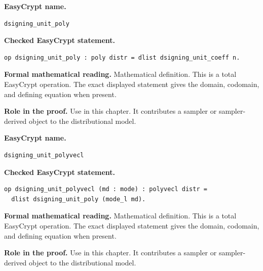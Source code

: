 \begin{formaldefinition}
\noindent\textbf{EasyCrypt name.}
\begin{lstlisting}[language=EasyCrypt,basicstyle=\ttfamily\scriptsize]
dsigning_unit_poly
\end{lstlisting}
\noindent\textbf{Checked EasyCrypt statement.}
\begin{lstlisting}[language=EasyCrypt,basicstyle=\ttfamily\scriptsize]
op dsigning_unit_poly : poly distr = dlist dsigning_unit_coeff n.
\end{lstlisting}
\noindent\textbf{Formal mathematical reading.}
Mathematical definition. This is a total EasyCrypt operation.  The exact displayed statement gives the domain, codomain, and defining equation when present.

\noindent\textbf{Role in the proof.}
Use in this chapter. It contributes a sampler or sampler-derived object to the distributional model.

\end{formaldefinition}

\begin{formaldefinition}
\noindent\textbf{EasyCrypt name.}
\begin{lstlisting}[language=EasyCrypt,basicstyle=\ttfamily\scriptsize]
dsigning_unit_polyvecl
\end{lstlisting}
\noindent\textbf{Checked EasyCrypt statement.}
\begin{lstlisting}[language=EasyCrypt,basicstyle=\ttfamily\scriptsize]
op dsigning_unit_polyvecl (md : mode) : polyvecl distr =
  dlist dsigning_unit_poly (mode_l md).
\end{lstlisting}
\noindent\textbf{Formal mathematical reading.}
Mathematical definition. This is a total EasyCrypt operation.  The exact displayed statement gives the domain, codomain, and defining equation when present.

\noindent\textbf{Role in the proof.}
Use in this chapter. It contributes a sampler or sampler-derived object to the distributional model.

\end{formaldefinition}

